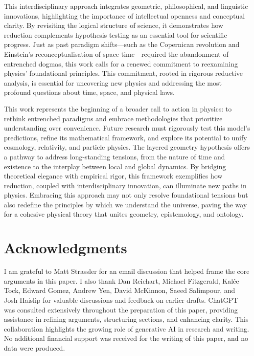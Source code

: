 \documentclass[aps,rmp,groupedaddress,twocolumn,10pt]{revtex4-2}
\begin{document}
This interdisciplinary approach integrates geometric, philosophical, and linguistic innovations, highlighting the importance of intellectual openness and conceptual clarity. By revisiting the logical structure of science, it demonstrates how reduction complements hypothesis testing as an essential tool for scientific progress. Just as past paradigm shifts---such as the Copernican revolution and Einstein's reconceptualisation of space-time---required the abandonment of entrenched dogmas, this work calls for a renewed commitment to reexamining physics' foundational principles. This commitment, rooted in rigorous reductive analysis, is essential for uncovering new physics and addressing the most profound questions about time, space, and physical laws.

This work represents the beginning of a broader call to action in physics: to rethink entrenched paradigms and embrace methodologies that prioritize understanding over convenience. Future research must rigorously test this model's predictions, refine its mathematical framework, and explore its potential to unify cosmology, relativity, and particle physics. The layered geometry hypothesis offers a pathway to address long-standing tensions, from the nature of time and existence to the interplay between local and global dynamics. By bridging theoretical elegance with empirical rigor, this framework exemplifies how reduction, coupled with interdisciplinary innovation, can illuminate new paths in physics. Embracing this approach may not only resolve foundational tensions but also redefine the principles by which we understand the universe, paving the way for a cohesive physical theory that unites geometry, epistemology, and ontology.

\section*{Acknowledgments}

I am grateful to Matt Strassler for an email discussion that helped frame the core arguments in this paper. I also thank Dan Reichart, Michael Fitzgerald, Kal\'{e}e Tock, Edward Gomez, Andrew Yen, David McKinnon, Saeed Salimpour, and Josh Haislip for valuable discussions and feedback on earlier drafts. ChatGPT was consulted extensively throughout the preparation of this paper, providing assistance in refining arguments, structuring sections, and enhancing clarity. This collaboration highlights the growing role of generative AI in research and writing. No additional financial support was received for the writing of this paper, and no data were produced.


\end{document}
